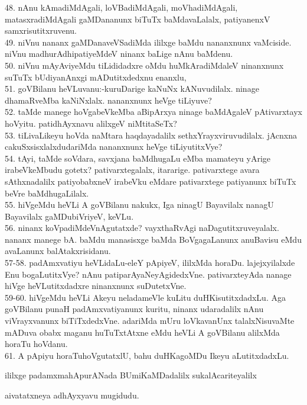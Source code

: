 \documentclass{article}
\begin{document}
48. nAnu kAmadiMdAgali, loVBadiMdAgali, moVhadiMdAgali, matasxradiMdAgali gaMDananunx biTuTx baMdavaLalalx, patiyanenxV samxrisutitxruvenu.\\
49. niVnu nananx gaMDanaveVSadiMda ililxge baMdu nananxnunx vaMciside. niVnu madhurAdhipatiyeMdeV ninanx baLige nAnu baMdenu.\\
50. niVnu mAyAviyeMdu tiLididadxre oMdu huMkAradiMdaleV ninanxnunx suTuTx bUdiyanAnxgi mADutitxdedxnu enanxlu,\\
51. goVBilanu heVLuvanu:-kuruDarige kaNuNx kANuvudilalx. ninage dhamaRveMba kaNiNxlalx. nananxnunx heVge tiLiyuve?\\
52. taMde manege hoVgabeVkeMba aBipArxya ninage baMdAgaleV pAtivarxtayx hoVyitu. patidhAyxnavu alilxgeV niMtitaSeTx?\\
53. tiLivaLikeyu hoVda naMtara haqdayadalilx sethxYrayxviruvudilalx. jAcnxna cakuSxsisxlalxdudariMda nananxnunx heVge tiLiyutitxVye?\\
54. tAyi, taMde soVdara, savxjana baMdhugaLu eMba mamateyu yArige irabeVkeMbudu gotetx? pativarxtegalalx, itararige. pativarxtege avara sAthxnadalilx patiyobabxneV irabeVku eMdare pativarxtege patiyanunx biTuTx beVre baMdhugaLilalx.\\
55. hiVgeMdu heVLi A goVBilanu nakukx, Iga ninagU Bayavilalx nanagU Bayavilalx gaMDubiVriyeV, keVLu.\\
56. ninanx koVpadiMdeVnAgutatxde? vayxthaRvAgi naDagutitxruveyalalx. nananx manege bA. baMdu manasisxge baMda BoVgagaLanunx anuBavisu eMdu avaLanunx balAtakxrisidanu.\\
57-58. padAmxvatiyu heVLidaLu-eleY pApiyeV, ililxMda horaDu. lajejxyilalxde Enu bogaLutitxVye? nAnu patiparAyaNeyAgidedxVne. pativarxteyAda nanage hiVge heVLutitxdadxre ninanxnunx suDutetxVne.\\
59-60. hiVgeMdu heVLi Akeyu neladameVle kuLitu duHKisutitxdadxLu. Aga goVBilanu punaH padAmxvatiyanunx kuritu, ninanx udaradalilx nAnu viVrayxvanunx biTiTxdedxVne. adariMda mUru loVkavanUnx talalxNisuvaMte mADuva obabx maganu huTuTxtAtxne eMdu heVLi A goVBilanu alilxMda horaTu hoVdanu.\\
61. A pApiyu horaTuhoVgutatxlU, bahu duHKagoMDu Ikeyu aLutitxdadxLu.\\

\begin{center}
ililxge padamxmahApurANada BUmiKaMDadalilx sukalAcariteyalilx
\end{center}

\begin{center}
aivatatxneya adhAyxyavu mugidudu.
\end{center}
\end{document}
